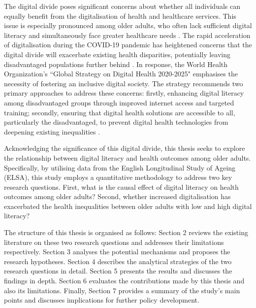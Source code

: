 The digital divide poses significant concerns about whether all individuals can equally benefit from the digitalisation of health and healthcare services. This issue is especially pronounced among older adults, who often lack sufficient digital literacy and simultaneously face greater healthcare needs \parencite{eyrich_bridging_2021}. The rapid acceleration of digitalisation during the COVID-19 pandemic has heightened concerns that the digital divide will exacerbate existing health disparities, potentially leaving disadvantaged populations further behind \parencite{alkureishi_digitally_2021}. In response, the World Health Organization's ``Global Strategy on Digital Health 2020-2025" emphasises the necessity of fostering an inclusive digital society. The strategy recommends two primary approaches to address these concerns: firstly, enhancing digital literacy among disadvantaged groups through improved internet access and targeted training; secondly, ensuring that digital health solutions are accessible to all, particularly the disadvantaged, to prevent digital health technologies from deepening existing inequalities \parencite{worldhealthorganization_global_2021}. 

Acknowledging the significance of this digital divide, this thesis seeks to explore the relationship between digital literacy and health outcomes among older adults. Specifically, by utilising data from the English Longitudinal Study of Ageing (ELSA), this study employs a quantitative methodology to address two key research questions. First, what is the causal effect of digital literacy on health outcomes among older adults? Second, whether increased digitalisation has exacerbated the health inequalities between older adults with low and high digital literacy?

The structure of this thesis is organised as follows: Section 2 reviews the existing literature on these two research questions and addresses their limitations respectively. Section 3 analyses the potential mechanisms and proposes the research hypotheses. Section 4 describes the analytical strategies of the two research questions in detail. Section 5 presents the results and discusses the findings in depth. Section 6 evaluates the contributions made by this thesis and also its limitations. Finally, Section 7 provides a summary of the study's main points and discusses implications for further policy development.
